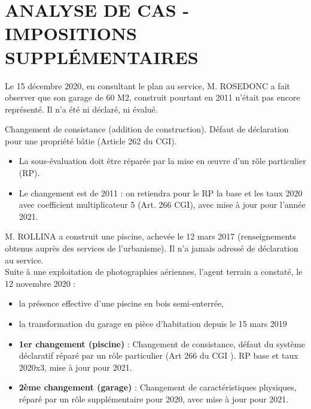 \documentclass[a4paper, 12pt]{exam}
\begin{document}
\section*{ANALYSE DE CAS  - IMPOSITIONS SUPPLÉMENTAIRES}

\begin{questions}
	\question Le 15 décembre 2020, en consultant le plan au service, M. ROSEDONC a fait observer que son garage de 60 M2, construit pourtant en 2011 n'était pas encore représenté. Il n'a été ni déclaré, ni évalué.
	\begin{solution}
		Changement de consistance (addition de construction). Défaut de déclaration pour une propriété bâtie (Article 262 du CGI).
		\begin{itemize}
			\item La sous-évaluation doit être réparée par la mise en œuvre d'un rôle particulier (RP).
			\item Le changement est de 2011 : on retiendra pour le RP la base et les taux 2020 avec coefficient multiplicateur 5 (Art. 266 CGI), avec mise à jour pour l'année 2021.
		\end{itemize}
	\end{solution}
	
	\question M. ROLLINA a construit une piscine, achevée le 12 mars 2017 (renseignements obtenus auprès des services de l'urbanisme). Il n'a jamais adressé de déclaration au service.\\
	
	Suite à une exploitation de photographies aériennes, l'agent terrain a constaté, le 12 novembre 2020 :
	\begin{itemize}
		\item la présence effective d'une piscine en bois semi-enterrée,
		\item  la transformation du garage en pièce d'habitation depuis le 15 mars 2019
	\end{itemize}
	\begin{solution}
		\begin{itemize}
			\item \textbf{1er changement (piscine)} : Changement de consistance, défaut du système déclaratif réparé par un rôle particulier (Art 266 du CGI ). RP base et taux 2020x3, mise à jour pour 2021.
			\item \textbf{2ème changement (garage)} : Changement de caractéristiques physiques, réparé par un rôle supplémentaire pour 2020, avec mise à jour pour 2021.
		\end{itemize}
	\end{solution}
	
\end{questions}

	
\end{document}
